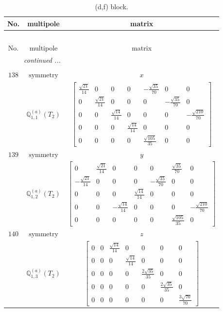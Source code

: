 \documentclass[fleqn,8pt,landscape]{jsarticle}
\begin{document}
\begin{longtable}{ccc}
\caption{(d,f) block.}
 \\
 \hline \hline
No. & multipole & matrix \\ \hline \endfirsthead

\multicolumn{2}{l}{\tablename\ \thetable{}} \\
 \hline \hline
No. & multipole & matrix \\ \hline \endhead

 \hline \hline
\multicolumn{2}{r}{\footnotesize\it continued ...} \\ \endfoot

 \hline \hline
\multicolumn{2}{r}{} \\ \endlastfoot

$ 138 $ & $ \text{symmetry} $ & $ x $ \\
$  $ & $ \mathbb{Q}_{1,1}^{(a)}(T_{2}) $ & $ \begin{bmatrix} \frac{\sqrt{21}}{14} & 0 & 0 & 0 & - \frac{\sqrt{35}}{70} & 0 & 0 \\ 0 & \frac{\sqrt{21}}{14} & 0 & 0 & 0 & - \frac{\sqrt{35}}{70} & 0 \\ 0 & 0 & \frac{\sqrt{14}}{14} & 0 & 0 & 0 & - \frac{\sqrt{210}}{70} \\ 0 & 0 & 0 & \frac{\sqrt{14}}{14} & 0 & 0 & 0 \\ 0 & 0 & 0 & 0 & \frac{\sqrt{105}}{35} & 0 & 0 \end{bmatrix} $ \\ \hline
$ 139 $ & $ \text{symmetry} $ & $ y $ \\
$  $ & $ \mathbb{Q}_{1,2}^{(a)}(T_{2}) $ & $ \begin{bmatrix} 0 & \frac{\sqrt{21}}{14} & 0 & 0 & 0 & \frac{\sqrt{35}}{70} & 0 \\ - \frac{\sqrt{21}}{14} & 0 & 0 & 0 & - \frac{\sqrt{35}}{70} & 0 & 0 \\ 0 & 0 & 0 & \frac{\sqrt{14}}{14} & 0 & 0 & 0 \\ 0 & 0 & - \frac{\sqrt{14}}{14} & 0 & 0 & 0 & - \frac{\sqrt{210}}{70} \\ 0 & 0 & 0 & 0 & 0 & \frac{\sqrt{105}}{35} & 0 \end{bmatrix} $ \\ \hline
$ 140 $ & $ \text{symmetry} $ & $ z $ \\
$  $ & $ \mathbb{Q}_{1,3}^{(a)}(T_{2}) $ & $ \begin{bmatrix} 0 & 0 & \frac{\sqrt{14}}{14} & 0 & 0 & 0 & 0 \\ 0 & 0 & 0 & \frac{\sqrt{14}}{14} & 0 & 0 & 0 \\ 0 & 0 & 0 & 0 & \frac{2 \sqrt{35}}{35} & 0 & 0 \\ 0 & 0 & 0 & 0 & 0 & \frac{2 \sqrt{35}}{35} & 0 \\ 0 & 0 & 0 & 0 & 0 & 0 & \frac{3 \sqrt{70}}{70} \end{bmatrix} $ \\ \hline

\end{longtable}
\end{document}
